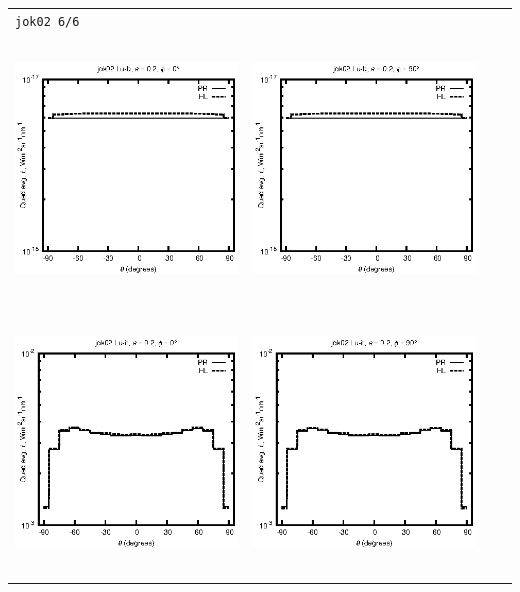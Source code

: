 \begin{tabular}{c c c c}
\multicolumn{4}{l}{\texttt{jok02 6/6}} \\
\includegraphics[height=7cm]{../eps/jok02_Lu_b_fwd.eps} &
\includegraphics[height=7cm]{../eps/jok02_Lu_b_cross.eps} \\
\includegraphics[height=7cm]{../eps/jok02_Lu_it_fwd.eps} &
\includegraphics[height=7cm]{../eps/jok02_Lu_it_cross.eps} \\

\end{tabular}
